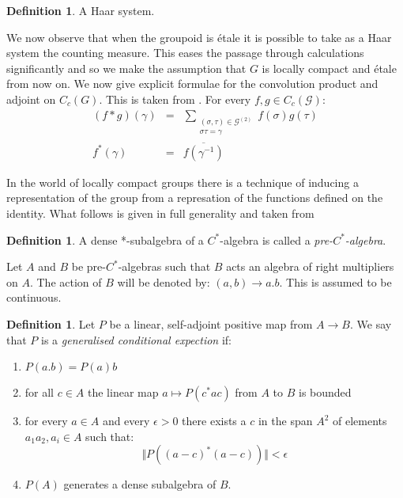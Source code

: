 \documentclass[11pt,]{amsbook}
\theoremstyle{plain}
\theoremstyle{definition}%
\newtheorem{definition}[theorem]{Definition}%
\theoremstyle{remark}%
\newcommand{\G}{\mathcal{G}}
\begin{document}
\begin{definition}
A Haar system.
\end{definition}

We now observe that when the groupoid is \'etale it is possible to take as a Haar system the counting measure. This eases the passage through calculations significantly and so we make the assumption that $G$ is locally compact and \'etale from now on. We now give explicit formulae for the convolution product and adjoint on $C_{c}(G)$. This is taken from \cite{MR2419901}. For every $f,g \in C_{c}(\G)$:
\begin{eqnarray*}
(f \ast g)(\gamma) & = & \sum_{\substack{(\sigma,\tau) \in \G^{(2)}\\ \sigma\tau=\gamma}}f(\sigma)g(\tau)\\
f^{*}(\gamma) & = & \overline{f(\gamma^{-1})} 
\end{eqnarray*}

In the world of locally compact groups there is a technique of inducing a representation of the group from a represation of the functions defined on the identity. What follows is given in full generality and taken from \cite[Appendix D]{MR1724106}
\begin{definition}
A dense *-subalgebra of a $C^{*}$-algebra is called a \textit{pre-$C^{*}$-algebra}.
\end{definition}

Let $A$ and $B$ be pre-$C^{*}$-algebras such that $B$ acts an algebra of right multipliers on $A$. The action of $B$ will be denoted by: $(a,b) \rightarrow a.b$. This is assumed to be continuous. 

\begin{definition}
Let $P$ be a linear, self-adjoint positive map from $A \rightarrow B$. We say that $P$ is a \textit{generalised conditional expection} if:
\begin{enumerate}
\item $P(a.b)=P(a)b$
\item for all $c \in A$ the linear map $a \mapsto P(c^{*}ac)$ from $A$ to $B$ is bounded
\item for every $a\in A$ and every $\epsilon > 0 $ there exists a $c$ in the span $A^{2}$ of elements $a_{1}a_{2}, a_{i} \in A$ such that:
\begin{equation*}
\Vert P((a-c)^{*}(a-c))\Vert < \epsilon
\end{equation*}
\item $P(A)$ generates a dense subalgebra of $B$.
\end{enumerate}
\end{definition}
\end{document}
